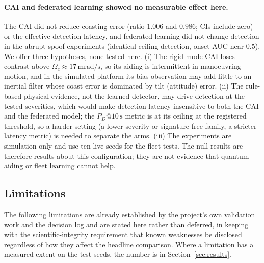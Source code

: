 \documentclass[journal]{IEEEtran}
\begin{document}
\paragraph{CAI and federated learning showed no measurable effect here.} The CAI did not reduce coasting error (ratio $1.006$ and $0.986$; CIs include zero) or the effective detection latency, and federated learning did not change detection in the abrupt-spoof experiments (identical ceiling detection, onset AUC near $0.5$). We offer three hypotheses, none tested here. (i) The rigid-mode CAI loses contrast above $\Omega_c\approx17\,\mathrm{mrad/s}$, so its aiding is intermittent in manoeuvring motion, and in the simulated platform its bias observation may add little to an inertial filter whose coast error is dominated by tilt (attitude) error. (ii) The rule-based physical evidence, not the learned detector, may drive detection at the tested severities, which would make detection latency insensitive to both the CAI and the federated model; the $P_D@10\,\mathrm{s}$ metric is at its ceiling at the registered threshold, so a harder setting (a lower-severity or signature-free family, a stricter latency metric) is needed to separate the arms. (iii) The experiments are simulation-only and use ten live seeds for the fleet tests. The null results are therefore results about this configuration; they are not evidence that quantum aiding or fleet learning cannot help.

\subsection{Limitations}
\label{sec:limitations}
The following limitations are already established by the project's own validation work and the decision log
and are stated here rather than deferred, in keeping with the scientific-integrity requirement that known
weaknesses be disclosed regardless of how they affect the headline comparison. Where a limitation has a
measured extent on the test seeds, the number is in Section~\ref{sec:results}.
\end{document}
